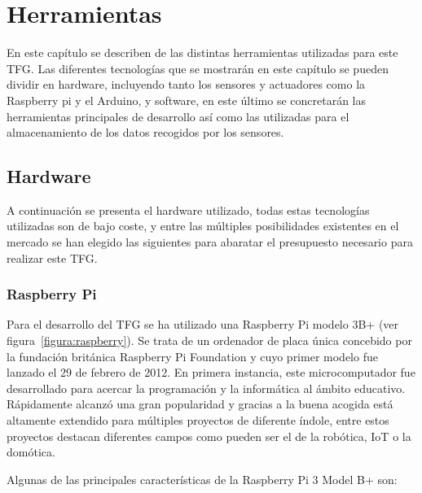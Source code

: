 \documentclass[a4paper, 12pt, oneside]{book}
\begin{document}

\cleardoublepage %
\chapter{Herramientas} 
\label{chap:herramientas}

En este capítulo se  describen de las distintas herramientas utilizadas para este TFG. Las diferentes tecnologías que se mostrarán en este capítulo se pueden dividir en hardware, incluyendo tanto los sensores y actuadores como la Raspberry pi y el Arduino, y software, en este último se concretarán las herramientas principales de desarrollo así como las utilizadas para el almacenamiento de los datos recogidos por los sensores.


\section{Hardware}
\label{sec:hardware}

A continuación se presenta el hardware utilizado, todas estas tecnologías utilizadas son de bajo coste, y entre las múltiples posibilidades existentes en el mercado se han elegido las siguientes para abaratar el presupuesto necesario para realizar este TFG.

\subsection{Raspberry Pi}
\label{subsec:raspberry pi}

Para el desarrollo del TFG se ha utilizado una Raspberry Pi modelo 3B+ (ver figura~\ref{figura:raspberry}). Se trata de un ordenador de placa única concebido por la fundación británica Raspberry Pi Foundation y cuyo primer modelo fue lanzado el 29 de febrero de 2012. En primera instancia, este microcomputador fue desarrollado para acercar la programación y la informática al ámbito educativo. Rápidamente alcanzó una gran popularidad y gracias a la buena acogida está altamente extendido para múltiples proyectos de diferente índole, entre estos proyectos destacan diferentes campos como pueden ser el de la robótica, IoT o la domótica.

Algunas de las principales características de la Raspberry Pi 3 Model B+ son:
\end{document}
